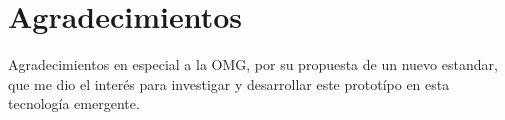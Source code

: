 \documentclass{melta}
\begin{document}
\section{Agradecimientos}
Agradecimientos en especial a la OMG, por su propuesta de un nuevo estandar, que me dio el interés para investigar y desarrollar este prototípo en esta tecnología emergente.

\nocite{*} 




\end{document}
